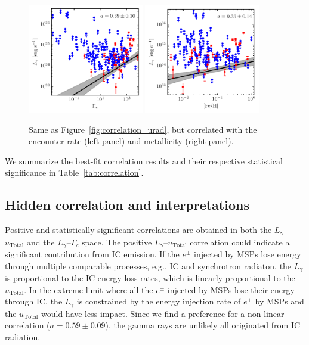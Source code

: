 \documentclass[doublespace,nopageskip]{VTthesis} %
\begin{document}
\begin{figure}[htb]
    \centering
    \includegraphics[width=0.45\textwidth]{Figures/Globular/correlation/L_gamma_vs_encounter_rate.pdf}
    \includegraphics[width=0.45\textwidth]{Figures/Globular/correlation/L_gamma_vs_metallicity.pdf}
    \caption{\label{fig:correlation_other} Same as Figure~\ref{fig:correlation_urad}, but correlated with the encounter rate (left panel) and metallicity (right panel).}
\end{figure}

We summarize the best-fit correlation results and their respective statistical significance in Table~\ref{tab:correlation}.

\subsection{Hidden correlation and interpretations}\label{sec:hidden}

Positive and statistically significant correlations are obtained in both the $L_\gamma$--$u_\mathrm{Total}$ and the $L_\gamma$--$\Gamma_c$ space. The positive $L_\gamma$--$u_\mathrm{Total}$ correlation could indicate a  significant contribution from IC emission. If the $e^\pm$ injected by MSPs lose energy through multiple comparable processes, e.g., IC and synchrotron radiaton, the $L_\gamma$ is proportional to the IC energy loss rates, which is linearly proportional to the $u_\mathrm{Total}$. In the extreme limit where all the $e^\pm$ injected by MSPs lose their energy through IC, the $L_\gamma$ is constrained by the energy injection rate of $e^\pm$ by MSPs and the $u_\mathrm{Total}$ would have less impact. Since we find a preference for a non-linear correlation ($a= 0.59 \pm 0.09$), the gamma rays are unlikely all originated from IC radiation.
\end{document}
